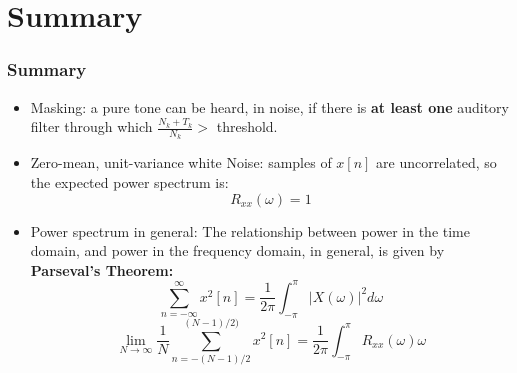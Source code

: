 \documentclass{beamer}
\begin{document}
\section[Summary]{Summary}
\setcounter{subsection}{1}

\begin{frame}
  \frametitle{Summary}
  \begin{itemize}
  \item Masking: a pure tone can be heard, in noise, if there is {\bf at least one}
    auditory filter through which $\frac{N_k+T_k}{N_k}>$ threshold.
  \item Zero-mean, unit-variance white Noise: samples of $x[n]$ are
    uncorrelated, so the expected power spectrum is:
    \begin{displaymath}
      R_{xx}(\omega) = 1
    \end{displaymath}
  \item Power spectrum in general: The relationship between power in
    the time domain, and power in the frequency domain, in general, is
    given by {\bf Parseval's Theorem:}
    \begin{displaymath}
      \sum_{n=-\infty}^\infty x^2[n] = \frac{1}{2\pi}\int_{-\pi}^\pi |X(\omega)|^2d\omega
    \end{displaymath}
    \begin{displaymath}
      \lim_{N\rightarrow\infty}\frac{1}{N}\sum_{n=-(N-1)/2}^{(N-1)/2)} x^2[n] =
      \frac{1}{2\pi}\int_{-\pi}^\pi R_{xx}(\omega)\omega
    \end{displaymath}
  \end{itemize}
\end{frame}
\end{document}
